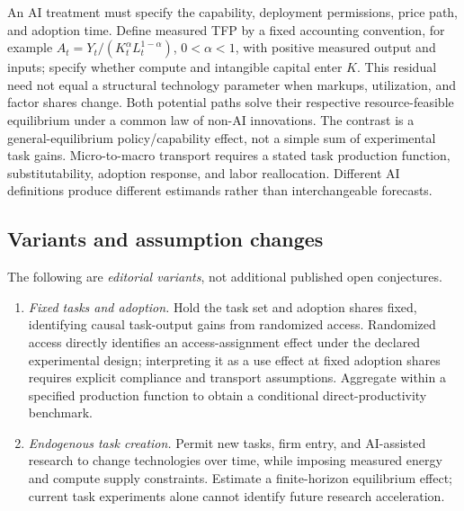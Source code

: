 \documentclass[11pt,a4paper]{article}
\begin{document}
An AI treatment must specify the capability, deployment permissions, price path, and adoption time. Define measured TFP by a fixed accounting convention, for example \(A_t=Y_t/(K_t^{\alpha}L_t^{1-\alpha})\), \(0<\alpha<1\), with positive measured output and inputs; specify whether compute and intangible capital enter \(K\). This residual need not equal a structural technology parameter when markups, utilization, and factor shares change. Both potential paths solve their respective resource-feasible equilibrium under a common law of non-AI innovations. The contrast is a general-equilibrium policy/capability effect, not a simple sum of experimental task gains. Micro-to-macro transport requires a stated task production function, substitutability, adoption response, and labor reallocation. Different AI definitions produce different estimands rather than interchangeable forecasts.
\subsection*{Variants and assumption changes}
The following are \emph{editorial variants}, not additional published open conjectures.
\begin{enumerate}
\item \emph{Fixed tasks and adoption.} Hold the task set and adoption shares fixed, identifying causal task-output gains from randomized access. Randomized access directly identifies an access-assignment effect under the declared experimental design; interpreting it as a use effect at fixed adoption shares requires explicit compliance and transport assumptions. Aggregate within a specified production function to obtain a conditional direct-productivity benchmark.
\item \emph{Endogenous task creation.} Permit new tasks, firm entry, and AI-assisted research to change technologies over time, while imposing measured energy and compute supply constraints. Estimate a finite-horizon equilibrium effect; current task experiments alone cannot identify future research acceleration.
\end{enumerate}
\end{document}
